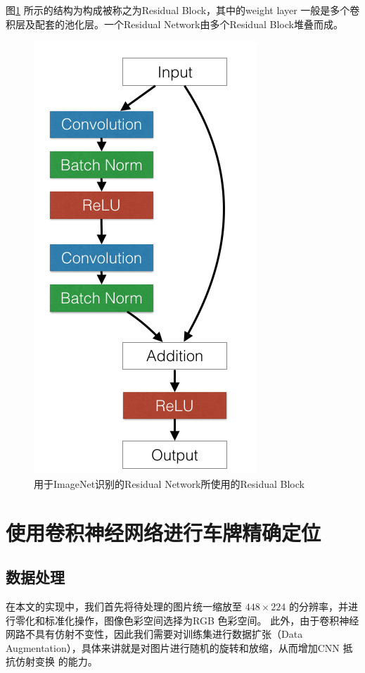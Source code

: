 图\ref{Fig:ResBlockActual} 所示的结构为构成被称之为Residual Block，其中的weight layer
一般是多个卷积层及配套的池化层。一个Residual Network由多个Residual Block堆叠而成。

\begin{figure}
  \centering
  \includegraphics[height=0.3\textheight,
  keepaspectratio]{./Figure/ResBlockActual.png}
  \caption{用于ImageNet识别的Residual Network所使用的Residual
    Block}\label{Fig:ResBlockActual}
\end{figure}

\section{使用卷积神经网络进行车牌精确定位}

\subsection{数据处理}

在本文的实现中，我们首先将待处理的图片统一缩放至 $448 \times 224$ 的分辨率，并进
行零化和标准化操作，图像色彩空间选择为RGB 色彩空间。
此外，由于卷积神经网路不具有仿射不变性，因此我们需要对训练集进行数据扩张（Data
Augmentation），具体来讲就是对图片进行随机的旋转和放缩，从而增加CNN 抵抗仿射变换
的能力。


